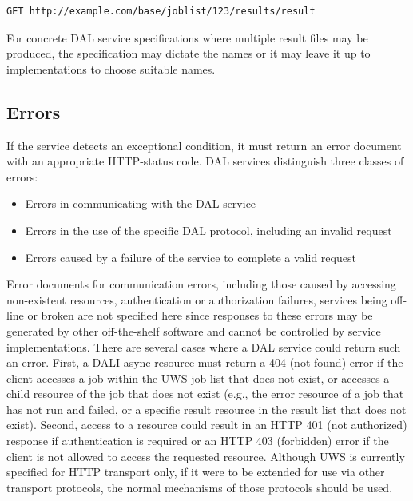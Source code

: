 \documentclass[11pt,letter]{ivoa}
\begin{document}
\begin{verbatim}
GET http://example.com/base/joblist/123/results/result
\end{verbatim}

For concrete DAL service specifications where multiple result files may be 
produced, the specification may dictate the names or it may leave it up to 
implementations to choose suitable names.

\subsection{Errors}
\label{sec:response-error}
If the service detects an exceptional condition, it must return an error 
document with an appropriate HTTP-status code. DAL services distinguish three 
classes of errors:

\begin{itemize}
\item Errors in communicating with the DAL service 

\item Errors in the use of the specific DAL protocol, including an invalid 
request 

\item Errors caused by a failure of the service to complete a valid request 
\end{itemize}

Error documents for communication errors, including those caused by accessing 
non-existent resources, authentication or authorization failures, services being 
off-line or broken are not specified here since responses to these errors may be 
generated by other off-the-shelf software and cannot be controlled by service 
implementations. There are several cases where a DAL service could return such 
an error. First, a DALI-async resource must return a 404 (not found) error if 
the client accesses a job within the UWS job list that does not exist, or 
accesses a child resource of the job that does not exist (e.g., the error 
resource of a job that has not run and failed, or a specific result resource in 
the result list  that does not exist). Second, access to a resource could result 
in an HTTP 401 (not authorized) response if authentication is required or an 
HTTP 403 (forbidden) error if the client is not allowed to access the requested 
resource. Although UWS is currently specified for HTTP transport only, if it 
were to be extended for use via other transport protocols, the normal mechanisms 
of those protocols should be used.
\end{document}
